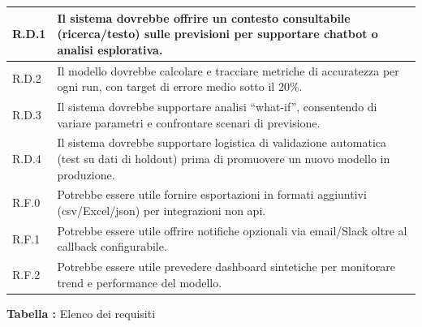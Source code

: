{\begin{supertabular}{|p{2.5cm}|p{11.5cm}|}
R.D.1 & Il sistema dovrebbe offrire un contesto consultabile (ricerca/testo) sulle previsioni per supportare chatbot o analisi esplorativa. \\ \hline
R.D.2 & Il modello dovrebbe calcolare e tracciare metriche di accuratezza per ogni run, con target di errore medio sotto il 20\%. \\ \hline
R.D.3 & Il sistema dovrebbe supportare analisi “what-if”, consentendo di variare parametri e confrontare scenari di previsione. \\ \hline
R.D.4 & Il sistema dovrebbe supportare logistica di validazione automatica (test su dati di holdout) prima di promuovere un nuovo modello in produzione. \\ \hline
R.F.0 & Potrebbe essere utile fornire esportazioni in formati aggiuntivi (\gls{csv}/Excel/\gls{json}) per integrazioni non \gls{api}. \\ \hline
R.F.1 & Potrebbe essere utile offrire notifiche opzionali via email/Slack oltre al \gls{callback} configurabile. \\ \hline
R.F.2 & Potrebbe essere utile prevedere dashboard sintetiche per monitorare trend e performance del modello. \\ \hline
\end{supertabular}

\par
}

\begin{center}
\textbf{Tabella \thetable:} Elenco dei requisiti
\label{tab:requisiti}
\end{center}

\newpage
